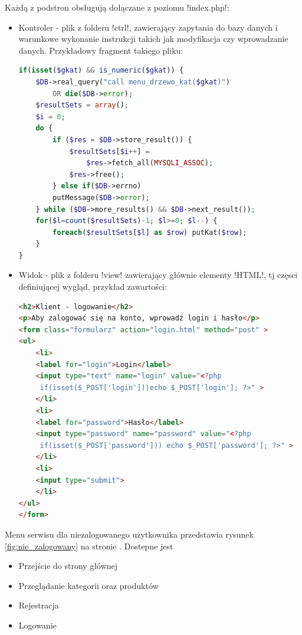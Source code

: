 Każdą z podstron obsługują dołączane z poziomu \s!index.php!:
\begin{itemize}
	\item Kontroler - plik z folderu \s!ctrl!, zawierający zapytania do bazy danych i warunkowe wykonanie instrukcji takich jak modyfikacja czy wprowadzanie danych. Przykładowy fragment takiego pliku:
\begin{lstlisting}[language=PHP]
if(isset($gkat) && is_numeric($gkat)) {
	$DB->real_query("call menu_drzewo_kat($gkat)") 
		OR die($DB->error);
	$resultSets = array();
	$i = 0;
	do {
		if ($res = $DB->store_result()) {
			$resultSets[$i++] = 
				$res->fetch_all(MYSQLI_ASSOC);
			$res->free();
		} else if($DB->errno)
		putMessage($DB->error);
	} while ($DB->more_results() && $DB->next_result());
	for($l=count($resultSets)-1; $l>=0; $l--) {
		foreach($resultSets[$l] as $row) putKat($row);
	}
}
\end{lstlisting}
	\item Widok - plik z folderu \s!view! zawierający głównie elementy \s!HTML!, tj częsci definiującej wygląd, przykład zawartości:
\begin{lstlisting}[language=HTML,showstringspaces=false]
<h2>Klient - logowanie</h2>
<p>Aby zalogować się na konto, wprowadź login i hasło</p>
<form class="formularz" action="login.html" method="post" >
<ul>
	<li>
	<label for="login">Login</label>
	<input type="text" name="login" value="<?php
	 if(isset($_POST['login']))echo $_POST['login']; ?>" >
	</li>
	<li>
	<label for="password">Hasło</label>
	<input type="password" name="password" value="<?php
	 if(isset($_POST['password'])) echo $_POST['password']; ?>" >
	</li>
	<li>
	<input type="submit">
	</li>
</ul>
</form>
\end{lstlisting}
\end{itemize}
Menu serwisu dla niezalogowanego użytkownika przedstawia rysunek \ref{fig:nie_zalogowany} na stronie \pageref{fig:nie_zalogowany}. Dostepne jest 
\begin{itemize}
	\item Przejście do strony głównej
	\item Przeglądanie kategorii oraz produktów 
	\item Rejestracja
	\item Logowanie
\end{itemize}


